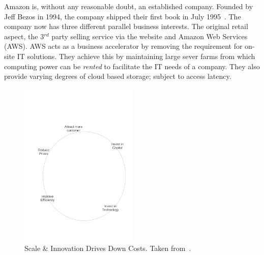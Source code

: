 {}

Amazon is, without any reasonable doubt, an established company.
Founded by Jeff Bezos in 1994, the company shipped their first book in July 1995~\cite{seattle}.
The company now has three different parallel business interests.
The original retail aspect, the 3$^{rd}$ party selling service via the website and Amazon Web Services (AWS).
AWS acts as a business accelerator by removing the requirement for on-site IT solutions.
They achieve this by maintaining large sever farms from which computing power can be \emph{rented} to facilitate the IT needs of a company.
They also provide varying degrees of cloud based storage; subject to access latency.





\begin{figure}
	\centering
	\includegraphics[width=0.5\textwidth]{./Figures/ScaleInnovation.pdf}
	\caption{Scale \& Innovation Drives Down Costs. Taken from~\cite{gavin2014ams}.}
	\label{fig:ScaleInnovation}
\end{figure}

